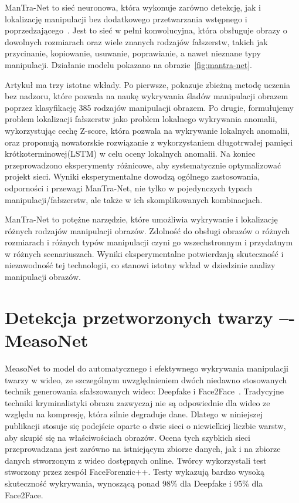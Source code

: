 ManTra-Net to sieć neuronowa, która wykonuje zarówno detekcję, jak i lokalizację manipulacji bez dodatkowego przetwarzania wstępnego i poprzedzającego~\cite{ManTraNet}.
Jest to sieć w pełni konwolucyjna, która obsługuje obrazy o dowolnych rozmiarach oraz wiele znanych rodzajów fałszerstw, takich jak przycinanie, kopiowanie, usuwanie, poprawianie, a nawet nieznane typy manipulacji.
Działanie modelu pokazano na obrazie~\ref{fig:mantra-net}.

Artykuł ma trzy istotne wkłady.
Po pierwsze, pokazuje zbieżną metodę uczenia bez nadzoru, które pozwala na naukę wykrywania śladów manipulacji obrazem poprzez klasyfikację 385 rodzajów manipulacji obrazem.
Po drugie, formułujemy problem lokalizacji fałszerstw jako problem lokalnego wykrywania anomalii, wykorzystując cechę Z-score, która pozwala na wykrywanie lokalnych anomalii, oraz proponują nowatorskie rozwiązanie z wykorzystaniem długotrwałej pamięci krótkoterminowej(LSTM) w celu oceny lokalnych anomalii.
Na koniec przeprowadzono eksperymenty różnicowe, aby systematycznie optymalizować projekt sieci.
Wyniki eksperymentalne dowodzą ogólnego zastosowania, odporności i przewagi ManTra-Net, nie tylko w pojedynczych typach manipulacji/fałszerstw, ale także w ich skomplikowanych kombinacjach.

ManTra-Net to potężne narzędzie, które umożliwia wykrywanie i lokalizację różnych rodzajów manipulacji obrazów.
Zdolność do obsługi obrazów o różnych rozmiarach i różnych typów manipulacji czyni go wszechstronnym i przydatnym w różnych scenariuszach.
Wyniki eksperymentalne potwierdzają skuteczność i niezawodność tej technologii, co stanowi istotny wkład w dziedzinie analizy manipulacji obrazów.


\section{Detekcja przetworzonych twarzy –- MeasoNet}

MeasoNet to model do automatycznego i efektywnego wykrywania manipulacji twarzy w wideo, ze szczególnym uwzględnieniem dwóch niedawno stosowanych technik generowania sfałszowanych wideo: Deepfake i Face2Face~\cite{mesoNet}.
Tradycyjne techniki kryminalistyki obrazu zazwyczaj nie są odpowiednie dla wideo ze względu na kompresję, która silnie degraduje dane.
Dlatego w niniejszej publikacji stosuje się podejście oparte o dwie sieci o niewielkiej liczbie warstw, aby skupić się na właściwościach obrazów.
Ocena tych szybkich sieci przeprowadzana jest zarówno na istniejącym zbiorze danych, jak i na zbiorze danych stworzonym z wideo dostępnych online.
Twórcy wykorzystali test stworzony przez zespół FaceForenzic++.
Testy wykazują bardzo wysoką skuteczność wykrywania, wynoszącą ponad 98\% dla Deepfake i 95\% dla Face2Face.


